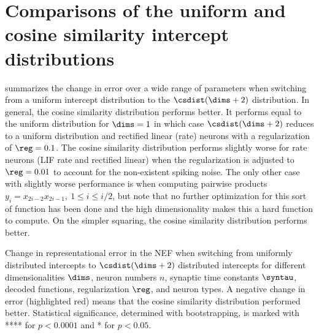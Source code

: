\chapter{Comparisons of the uniform and cosine similarity intercept distributions}\label{apdx:hdrep}
 summarizes the change in error over a wide range of parameters when switching from a uniform intercept distribution to the $\csdist(\dims + 2)$ distribution.
In general, the cosine similarity distribution performs better.
It performs equal to the uniform distribution for $\dims = 1$ in which case $\csdist(\dims + 2)$ reduces to a uniform distribution and rectified linear (rate) neurons with a regularization of $\reg = 0.1$.
The cosine similarity distribution performs slightly worse for rate neurons (LIF rate and rectified linear) when the regularization is adjusted to $\reg = 0.01$ to account for the non-existent spiking noise.
The only other case with slightly worse performance is when computing pairwise products $y_i = x_{2i - 2} x_{2i - 1},\ 1 \leq i \leq i/2$, but note that no further optimization for this sort of function has been done and the high dimensionality makes this a hard function to compute.
On the simpler squaring, the cosine similarity distribution performs better.
\begin{table}
    \begin{addmargin*}[0mm]{-26pt}
        \caption[Comparison of uniformly and $\csdist(\dims + 2)$ distributed intercepts]{Change in representational error in the NEF when switching from uniformly distributed intercepts to $\csdist(\dims + 2)$ distributed intercepts for different dimensionalities $\dims$, neuron numbers $n$, synaptic time constants $\syntau$, decoded functions, regularization $\reg$, and neuron types.
    A negative change in error (highlighted red) means that the cosine similarity distribution performed better.
    Statistical significance, determined with bootstrapping, is marked with **** for $p < 0.0001$ and * for $p < 0.05$.}\label{tbl:csdist}
        \scriptsize\centering
        
    \end{addmargin*}
\end{table}
